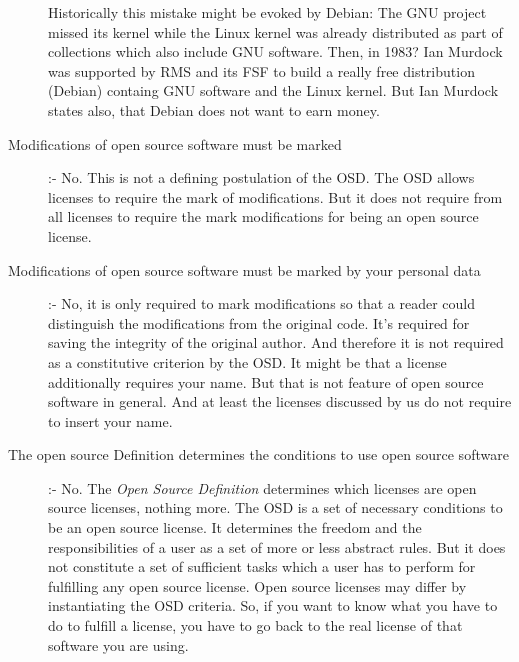 \begin{description}
  Historically this mistake might be evoked by Debian: The GNU project missed
  its kernel while the Linux kernel was already distributed as part of
  collections which also include GNU software. Then, in 1983? Ian Murdock was
  supported by RMS and its FSF to build a really free distribution (Debian)
  containg GNU software and the Linux kernel. But Ian Murdock states also, that
  Debian does not want to earn money.
  \item[Modifications of open source software must be marked] :- No. This is not
  a defining postulation of the OSD. The OSD allows licenses to require the mark
  of modifications. But it does not require from all licenses to require the mark
  modifications for being an open source license.
  \item[Modifications of open source software must be marked by your personal
  data] :- No, it is only required to mark modifications so that a reader could
  distinguish the modifications from the original code. It's required for saving
  the integrity of the original author. And therefore it is not required as a
  constitutive criterion by the OSD. It might be that a license additionally
  requires your name. But that is not feature of open source software in general.
  And at least the licenses discussed by us do not require to insert your name.
  \item[The open source Definition determines the conditions to use open source
  software] :- No. The \emph{Open Source Definition} determines which licenses
  are open source licenses, nothing more. The OSD is a set of necessary
  conditions to be an open source license. It determines the freedom and the
  responsibilities of a user as a set of more or less abstract rules. But it
  does not constitute a set of sufficient tasks which a user has to perform for
  fulfilling any open source license. Open source licenses may differ by
  instantiating the OSD criteria. So, if you want to know what you have to do to
  fulfill a license, you have to go back to the real license of that software
  you are using.
\end{description}

%
